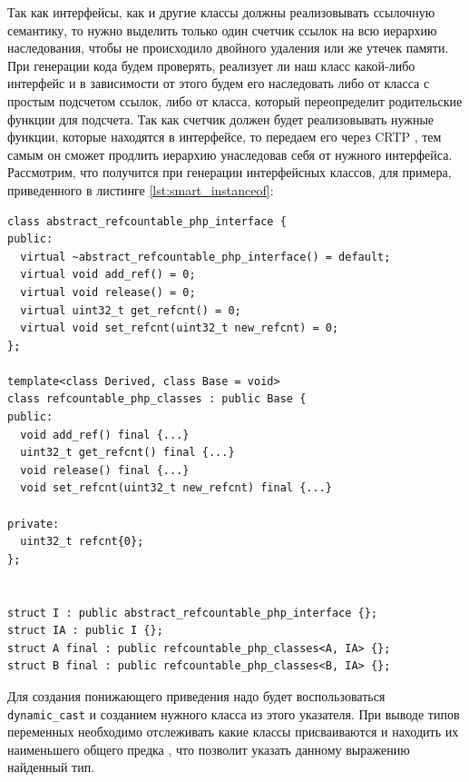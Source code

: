 Так как интерфейсы, как и другие классы должны реализовывать ссылочную семантику, то нужно выделить только один счетчик ссылок на всю иерархию наследования, чтобы не происходило двойного удаления или же утечек памяти.
При генерации кода будем проверять, реализует ли наш класс какой-либо интерфейс и в зависимости от этого будем его наследовать либо от класса с простым подсчетом ссылок, либо от класса, который переопределит родительские функции для подсчета.
Так как счетчик должен будет реализовывать нужные функции, которые находятся в интерфейсе, то передаем его через CRTP \cite{crtp}, тем самым он сможет продлить иерархию унаследовав себя от нужного интерфейса.
Рассмотрим, что получится при генерации интерфейсных классов, для примера, приведенного в листинге \ref{lst:smart_instanceof}:
\begin{lstlisting}
class abstract_refcountable_php_interface {
public:
  virtual ~abstract_refcountable_php_interface() = default;
  virtual void add_ref() = 0;
  virtual void release() = 0;
  virtual uint32_t get_refcnt() = 0;
  virtual void set_refcnt(uint32_t new_refcnt) = 0;
};

template<class Derived, class Base = void>
class refcountable_php_classes : public Base {
public:
  void add_ref() final {...}
  uint32_t get_refcnt() final {...}
  void release() final {...}
  void set_refcnt(uint32_t new_refcnt) final {...}

private:
  uint32_t refcnt{0};
};


struct I : public abstract_refcountable_php_interface {};
struct IA : public I {};
struct A final : public refcountable_php_classes<A, IA> {};
struct B final : public refcountable_php_classes<B, IA> {};
\end{lstlisting}

Для создания понижающего приведения надо будет воспользоваться \verb|dynamic_cast| и созданием нужного класса из этого указателя.
При выводе типов переменных необходимо отслеживать какие классы присваиваются и находить их наименьшего общего предка \cite{lca}, что позволит указать данному выражению найденный тип.

